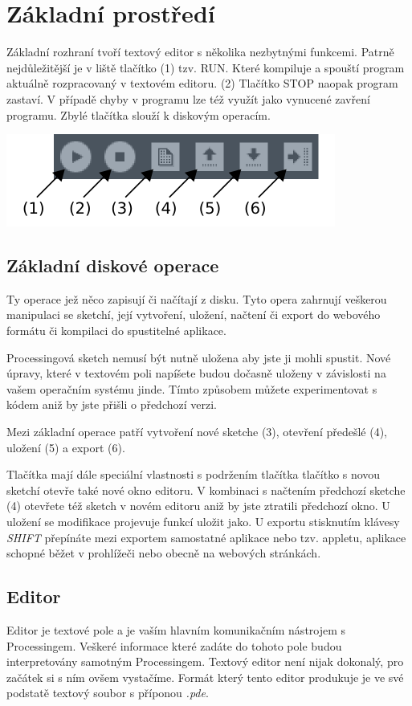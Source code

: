 \documentclass[12pt,twopage]{book}
\newcommand{\oddil}[1]{\section{#1}\label{sec:#1}}
\newcommand{\pododdil}[1]{\subsection{#1}\label{subsec:#1}}
\newcommand{\klavesy}[1]{\textsc{\em #1}}
\begin{document}
\oddil{Základní prostředí}


Základní rozhraní tvoří textový editor s několika nezbytnými funkcemi. Patrně nejdůležitější je v liště tlačítko (1) tzv. RUN. Které kompiluje a spouští program aktuálně rozpracovaný v textovém editoru. (2) Tlačítko STOP naopak program zastaví. V případě chyby v programu lze též využít jako vynucené zavření programu. Zbylé tlačítka slouží k diskovým operacím. \\


\begin{center}
\includegraphics[scale = 1]{imgs/buttons.png}
\end{center}


\newpage
\pododdil{Základní diskové operace}

Ty operace jež něco zapisují či načítají z disku. Tyto opera zahrnují veškerou manipulaci se sketchí, její vytvoření, uložení, načtení či export do webového formátu či kompilaci do spustitelné aplikace.

Processingová sketch nemusí být nutně uložena aby jste ji mohli spustit. Nové úpravy, které v textovém poli napíšete budou dočasně uloženy v závislosti na vašem operačním systému jinde. Tímto způsobem můžete experimentovat s kódem aniž by jste přišli o předchozí verzi.

Mezi základní operace patří vytvoření nové sketche (3), otevření předešlé (4), uložení (5) a export (6).

Tlačítka mají dále speciální vlastnosti s podržením tlačítka tlačítko s novou sketchí otevře také nové okno editoru. V kombinaci s načtením předchozí sketche (4) otevřete též sketch v novém editoru aniž by jste ztratili předchozí okno. U uložení se modifikace projevuje funkcí uložit jako. U exportu stisknutím klávesy \klavesy{SHIFT} přepínáte mezi exportem samostatné aplikace nebo tzv. appletu, aplikace schopné běžet v prohlížeči nebo obecně na webových stránkách.

\pododdil{Editor}

Editor je textové pole a je vaším hlavním komunikačním nástrojem s Processingem. Veškeré informace které zadáte do tohoto pole budou interpretovány samotným Processingem. Textový editor není nijak dokonalý, pro začátek si s ním ovšem vystačíme. Formát který tento editor produkuje je ve své podstatě textový soubor s příponou {\em *.pde}.
\end{document}
